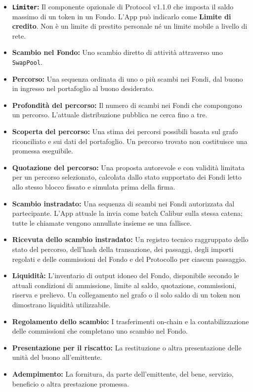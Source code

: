 \documentclass[11pt]{article}
\begin{document}
\begin{itemize}[leftmargin=*]
\item \textbf{\texttt{Limiter}:} Il componente opzionale di Protocol v1.1.0 che imposta il saldo massimo di un token in un Fondo. L'App può indicarlo come \textbf{Limite di credito}. Non è un limite di prestito personale né un limite mobile a livello di rete.
\item \textbf{Scambio nel Fondo:} Uno scambio diretto di attività attraverso uno \texttt{SwapPool}.
\item \textbf{Percorso:} Una sequenza ordinata di uno o più scambi nei Fondi, dal buono in ingresso nel portafoglio al buono desiderato.
\item \textbf{Profondità del percorso:} Il numero di scambi nei Fondi che compongono un percorso. L'attuale distribuzione pubblica ne cerca fino a tre.
\item \textbf{Scoperta del percorso:} Una stima dei percorsi possibili basata sul grafo riconciliato e sui dati del portafoglio. Un percorso trovato non costituisce una promessa eseguibile.
\item \textbf{Quotazione del percorso:} Una proposta autorevole e con validità limitata per un percorso selezionato, calcolata dallo stato supportato dei Fondi letto allo stesso blocco fissato e simulata prima della firma.
\item \textbf{Scambio instradato:} Una sequenza di scambi nei Fondi autorizzata dal partecipante. L'App attuale la invia come batch Calibur sulla stessa catena; tutte le chiamate vengono annullate insieme se una fallisce.
\item \textbf{Ricevuta dello scambio instradato:} Un registro tecnico raggruppato dello stato del percorso, dell'hash della transazione, dei passaggi, degli importi regolati e delle commissioni del Fondo e del Protocollo per ciascun passaggio.
\item \textbf{Liquidità:} L'inventario di output idoneo del Fondo, disponibile secondo le attuali condizioni di ammissione, limite al saldo, quotazione, commissioni, riserva e prelievo. Un collegamento nel grafo o il solo saldo di un token non dimostrano liquidità utilizzabile.
\item \textbf{Regolamento dello scambio:} I trasferimenti on-chain e la contabilizzazione delle commissioni che completano uno scambio nel Fondo.
\item \textbf{Presentazione per il riscatto:} La restituzione o altra presentazione delle unità del buono all'emittente.
\item \textbf{Adempimento:} La fornitura, da parte dell'emittente, del bene, servizio, beneficio o altra prestazione promessa.

\end{itemize}
\end{document}

